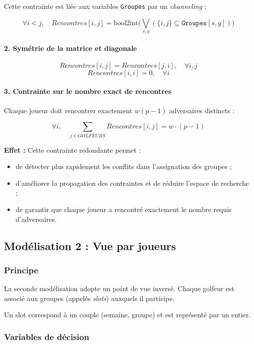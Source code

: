 \documentclass{article}
\begin{document}
Cette contrainte est liée aux variables \texttt{Groupes} par un \emph{channeling} :

\[
\forall i < j,\quad Rencontres[i,j] = \text{bool2int} \Big( \bigvee_{s,g} ( \{i,j\} \subseteq \texttt{Groupes}[s,g] ) \Big)
\]

\paragraph{2. Symétrie de la matrice et diagonale}
\[
Rencontres[i,j] = Rencontres[j,i], \quad \forall i,j
\]
\[
Rencontres[i,i] = 0, \quad \forall i
\]

\paragraph{3. Contrainte sur le nombre exact de rencontres}
Chaque joueur doit rencontrer exactement $w(p-1)$ adversaires distincts :

\[
\forall i,\quad \sum_{j \in GOLFEURS} Rencontres[i,j] = w \cdot (p-1)
\]

\noindent
\textbf{Effet :} Cette contrainte redondante permet :
\begin{itemize}
    \item de détecter plus rapidement les conflits dans l’assignation des groupes ;
    \item d’améliorer la propagation des contraintes et de réduire l’espace de recherche ;
    \item de garantir que chaque joueur a rencontré exactement le nombre requis d’adversaires.
\end{itemize}



\subsection{Modélisation 2 : Vue par joueurs}

\subsubsection{Principe}

La seconde modélisation adopte un point de vue inversé.
Chaque golfeur est associé aux groupes (appelés \emph{slots}) auxquels il participe.

Un slot correspond à un couple (semaine, groupe) et est représenté par un entier.

\subsubsection{Variables de décision}
\end{document}
